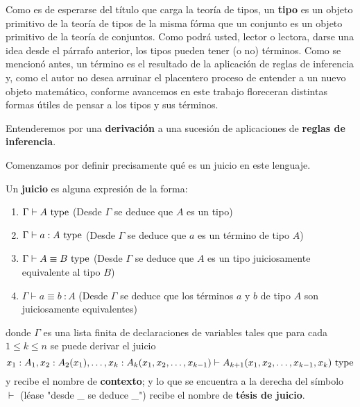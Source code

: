 \documentclass{article}
\begin{document}
        Como es de esperarse del título que carga la teoría de tipos, un \textbf{tipo} es un objeto primitivo de la teoría de tipos de la misma fórma que un conjunto
        es un objeto primitivo de la teoría de conjuntos. Como podrá usted, lector o lectora, darse una idea desde el párrafo anterior, los tipos pueden tener (o no)
        términos. Como se mencionó antes, un término es el resultado de la aplicación de reglas de inferencia y, como el autor no desea arruinar el placentero proceso
        de entender a un nuevo objeto matemático, conforme avancemos en este trabajo floreceran distintas formas útiles de pensar a los tipos y sus términos.

        Entenderemos por una \textbf{derivación} a una sucesión de aplicaciones de \textbf{reglas de inferencia}.

        Comenzamos por definir precisamente qué es un juicio en este lenguaje.
        \begin{definition}
            Un \textbf{juicio} es alguna expresión de la forma:
            \begin{enumerate}
                \item $\Gamma \vdash A\ \mathrm{type}$ (Desde $\Gamma$ se deduce que $A$ es un tipo)
                \item $\Gamma \vdash a : A\ \mathrm{type}$ (Desde $\Gamma$ se deduce que $a$ es un término de tipo $A$)
                \item $\Gamma \vdash A \equiv B\ \type$ (Desde $\Gamma$ se deduce que $A$ es un tipo juiciosamente equivalente al tipo $B$)
                \item $\Gamma \vdash a \equiv b\ : A$ (Desde $\Gamma$ se deduce que los términos $a$ y $b$ de tipo $A$ son juiciosamente equivalentes)
            \end{enumerate}

            donde $\Gamma$ es una lista finita de declaraciones de variables tales que para cada $1 \leq k \leq n$
            se puede derivar el juicio
            $$
                x_1 : A_1, x_2 : A_2(x_1), \dots, x_k : A_k(x_1, x_2, \dots, x_{k-1}) \vdash A_{k+1}(x_1, x_2, \dots, x_{k-1}, x_k)\ \mathrm{type}
            $$
            y recibe el nombre de \textbf{contexto}; y lo que se encuentra a la derecha del símbolo $\vdash$ 
            (léase "desde \_ se deduce \_") recibe el nombre de \textbf{tésis de juicio}.
        \end{definition}
\end{document}
